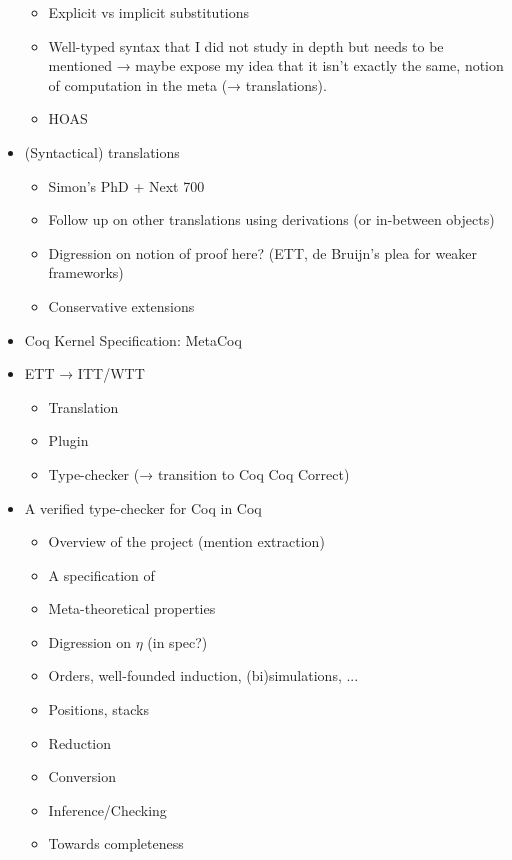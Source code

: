 \begin{itemize}
\begin{itemize}
      \item Explicit vs implicit substitutions
      \item Well-typed syntax that I did not study in depth but needs to be
      mentioned → maybe expose my idea that it isn't exactly the same,
      notion of computation in the meta (→ translations).
      \item HOAS
    \end{itemize}
  \item (Syntactical) translations
    \begin{itemize}
      \item Simon's PhD + Next 700
      \item Follow up on other translations using derivations (or in-between
      objects)
      \item Digression on notion of proof here? (ETT, de Bruijn's plea for
      weaker frameworks)
      \item Conservative extensions
    \end{itemize}
  \item Coq Kernel Specification: MetaCoq
  \item ETT → ITT/WTT
    \begin{itemize}
      \item Translation
      \item Plugin
      \item Type-checker (→ transition to Coq Coq Correct)
    \end{itemize}
  \item A verified type-checker for Coq in Coq
    \begin{itemize}
      \item Overview of the project (mention extraction)
      \item A specification of \Coq
      \item Meta-theoretical properties
      \item Digression on \(\eta\) (in spec?)
      \item Orders, well-founded induction, (bi)simulations, ...
      \item Positions, stacks
      \item Reduction
      \item Conversion
      \item Inference/Checking
      \item Towards completeness
    \end{itemize}
\end{itemize}